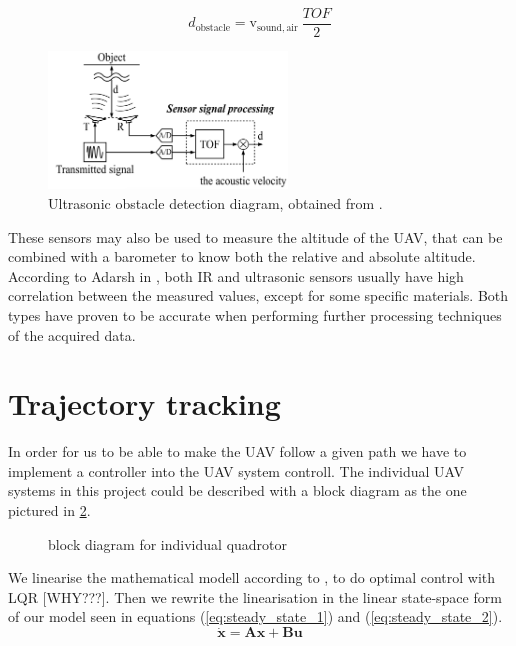 \documentclass[journal]{IEEEtran}
\newcommand*{\subb}[1]{_{\mathrm{#1}}}
\begin{document}
	\begin{equation} \label{eq:ultrasonic_formula}
	d\subb{obstacle} = \textrm{v}\subb{sound, air} \ \frac{TOF}{2}
	\end{equation}
	\begin{figure}[H]
		\centering
		\includegraphics[width=2.5in]{ultrasonic2}
		\caption{Ultrasonic obstacle detection diagram, obtained from \cite{hirata2008cross}.}
		\label{fig:ultrasonic}
	\end{figure}
	
	These sensors may also be used to measure the altitude of the UAV, that can be combined with a barometer to know both the relative and absolute altitude. According to Adarsh in \cite{AdarshS2016PcoI}, both IR and ultrasonic sensors usually have high correlation between the measured values, except for some specific materials. Both types have proven to be accurate when performing further processing techniques of the acquired data.
	
	
	\section{Trajectory tracking}
	In order for us to be able to make the UAV follow a given path we have to implement a controller into the UAV system controll. The individual UAV systems in this project could be described with a block diagram as the one pictured in \figurename{\ref{fig:block_diagram}}.
	\begin{figure}[h]
		\centering
		
		\caption{block diagram for individual quadrotor}
		\label{fig:block_diagram}
	\end{figure}	
	We linearise the mathematical modell according to \cite{SabatinoFrancesco2015Qcmn}, to do optimal control with LQR [WHY???]. Then we rewrite the linearisation in the linear state-space form \cite{SabatinoFrancesco2015Qcmn} of our model seen in equations (\ref{eq:steady_state_1}) and (\ref{eq:steady_state_2}).
	\begin{equation} \label{eq:steady_state_1}
			\bm{\dot x} = \bm{A} \bm{x} + \bm{B} \bm{u}
	\end{equation}
	
\end{document}
